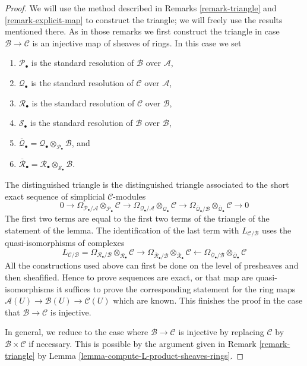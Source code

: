 \documentclass[10pt,a4paper]{article}
\theoremstyle{plain}
\theoremstyle{definition}
\theoremstyle{remark}
\numberwithin{equation}{subsection}
\begin{document}
\begin{proof}
We will use the method described in
Remarks \ref{remark-triangle} and \ref{remark-explicit-map}
to construct the triangle; we will freely use the results mentioned there.
As in those remarks we first construct the triangle in case
$\mathcal{B} \to \mathcal{C}$ is an injective map of sheaves of rings.
In this case we set
\begin{enumerate}
\item $\mathcal{P}_\bullet$ is the standard resolution of $\mathcal{B}$
over $\mathcal{A}$,
\item $\mathcal{Q}_\bullet$ is the standard resolution of $\mathcal{C}$
over $\mathcal{A}$,
\item $\mathcal{R}_\bullet$ is the standard resolution of $\mathcal{C}$
over $\mathcal{B}$,
\item $\mathcal{S}_\bullet$ is the standard resolution of $\mathcal{B}$
over $\mathcal{B}$,
\item $\overline{\mathcal{Q}}_\bullet =
\mathcal{Q}_\bullet \otimes_{\mathcal{P}_\bullet} \mathcal{B}$, and
\item $\overline{\mathcal{R}}_\bullet =
\mathcal{R}_\bullet \otimes_{\mathcal{S}_\bullet} \mathcal{B}$.
\end{enumerate}
The distinguished triangle is the distinguished triangle associated
to the short exact sequence
of simplicial $\mathcal{C}$-modules
$$
0 \to
\Omega_{\mathcal{P}_\bullet/\mathcal{A}}
\otimes_{\mathcal{P}_\bullet} \mathcal{C} \to
\Omega_{\mathcal{Q}_\bullet/\mathcal{A}}
\otimes_{\mathcal{Q}_\bullet} \mathcal{C} \to
\Omega_{\overline{\mathcal{Q}}_\bullet/\mathcal{B}}
\otimes_{\overline{\mathcal{Q}}_\bullet} \mathcal{C} \to 0
$$
The first two terms are equal to the first two terms of the triangle
of the statement of the lemma. The identification of the last term with
$L_{\mathcal{C}/\mathcal{B}}$ uses the quasi-isomorphisms of complexes
$$
L_{\mathcal{C}/\mathcal{B}} =
\Omega_{\mathcal{R}_\bullet/\mathcal{B}}
\otimes_{\mathcal{R}_\bullet} \mathcal{C}
\longrightarrow
\Omega_{\overline{\mathcal{R}}_\bullet/\mathcal{B}}
\otimes_{\overline{\mathcal{R}}_\bullet} \mathcal{C}
\longleftarrow
\Omega_{\overline{\mathcal{Q}}_\bullet/\mathcal{B}}
\otimes_{\overline{\mathcal{Q}}_\bullet} \mathcal{C}
$$
All the constructions used above can first be done on the level
of presheaves and then sheafified. Hence to prove sequences are exact,
or that map are quasi-isomorphisms it suffices to prove the corresponding
statement for the ring maps
$\mathcal{A}(U) \to \mathcal{B}(U) \to \mathcal{C}(U)$
which are known. This finishes the proof in the case that
$\mathcal{B} \to \mathcal{C}$ is injective.

\medskip\noindent
In general, we reduce to the case where $\mathcal{B} \to \mathcal{C}$ is
injective by replacing $\mathcal{C}$ by $\mathcal{B} \times \mathcal{C}$ if
necessary. This is possible by the argument given in
Remark \ref{remark-triangle} by
Lemma \ref{lemma-compute-L-product-sheaves-rings}.
\end{proof}
\end{document}
